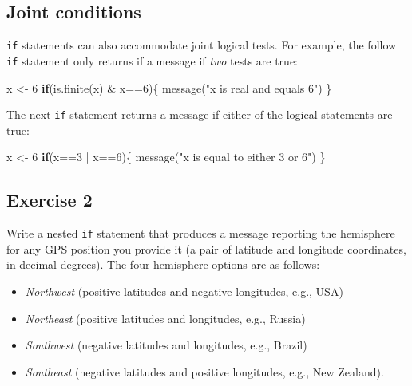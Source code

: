 \documentclass[
]{book}
\newenvironment{Shaded}{\begin{snugshade}}{\end{snugshade}}
\newcommand{\ControlFlowTok}[1]{\textcolor[rgb]{0.13,0.29,0.53}{\textbf{#1}}}
\newcommand{\DecValTok}[1]{\textcolor[rgb]{0.00,0.00,0.81}{#1}}
\newcommand{\FunctionTok}[1]{\textcolor[rgb]{0.00,0.00,0.00}{#1}}
\newcommand{\NormalTok}[1]{#1}
\newcommand{\OtherTok}[1]{\textcolor[rgb]{0.56,0.35,0.01}{#1}}
\newcommand{\SpecialCharTok}[1]{\textcolor[rgb]{0.00,0.00,0.00}{#1}}
\newcommand{\StringTok}[1]{\textcolor[rgb]{0.31,0.60,0.02}{#1}}
\providecommand{\tightlist}{%
  \setlength{\itemsep}{0pt}\setlength{\parskip}{0pt}}
\begin{document}
\hypertarget{joint-conditions}{%
\subsection*{Joint conditions}\label{joint-conditions}}

\texttt{if} statements can also accommodate joint logical tests. For example, the follow \texttt{if} statement only returns if a message if \emph{two} tests are true:

\begin{Shaded}
\begin{Highlighting}[]
\NormalTok{x }\OtherTok{\textless{}{-}} \DecValTok{6}
\ControlFlowTok{if}\NormalTok{(}\FunctionTok{is.finite}\NormalTok{(x) }\SpecialCharTok{\&}\NormalTok{ x}\SpecialCharTok{==}\DecValTok{6}\NormalTok{)\{}
  \FunctionTok{message}\NormalTok{(}\StringTok{"x is real and equals 6"}\NormalTok{)}
\NormalTok{\}}
\end{Highlighting}
\end{Shaded}

The next \texttt{if} statement returns a message if either of the logical statements are true:

\begin{Shaded}
\begin{Highlighting}[]
\NormalTok{x }\OtherTok{\textless{}{-}} \DecValTok{6}
\ControlFlowTok{if}\NormalTok{(x}\SpecialCharTok{==}\DecValTok{3} \SpecialCharTok{|}\NormalTok{ x}\SpecialCharTok{==}\DecValTok{6}\NormalTok{)\{}
  \FunctionTok{message}\NormalTok{(}\StringTok{"x is equal to either 3 or 6"}\NormalTok{)}
\NormalTok{\}}
\end{Highlighting}
\end{Shaded}

\hypertarget{exercise-2-8}{%
\subsection*{Exercise 2}\label{exercise-2-8}}

Write a nested \texttt{if} statement that produces a message reporting the hemisphere for any GPS position you provide it (a pair of latitude and longitude coordinates, in decimal degrees). The four hemisphere options are as follows:

\begin{itemize}
\tightlist
\item
  \emph{Northwest} (positive latitudes and negative longitudes, e.g., USA)\\
\item
  \emph{Northeast} (positive latitudes and longitudes, e.g., Russia)
\item
  \emph{Southwest} (negative latitudes and longitudes, e.g., Brazil)\\
\item
  \emph{Southeast} (negative latitudes and positive longitudes, e.g., New Zealand).
\end{itemize}
\end{document}
